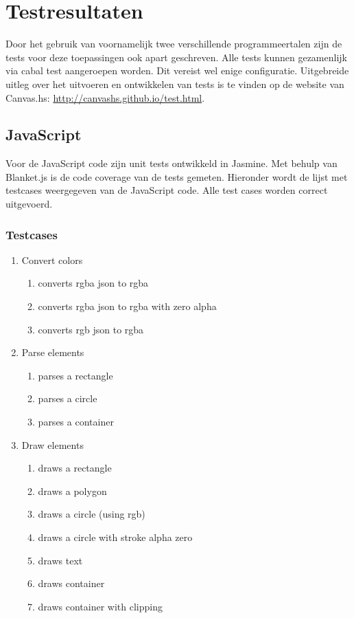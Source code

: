 \section{Testresultaten} \label{sec:testresultaten}


Door het gebruik van voornamelijk twee verschillende programmeertalen zijn de tests voor deze toepassingen ook apart geschreven. Alle tests kunnen gezamenlijk via cabal test aangeroepen worden. Dit vereist wel enige configuratie. Uitgebreide uitleg over het uitvoeren en ontwikkelen van tests is te vinden op de website van Canvas.hs: \url{http://canvashs.github.io/test.html}.

\subsection{JavaScript}
Voor de JavaScript code zijn unit tests ontwikkeld in Jasmine. Met behulp van Blanket.js is de code coverage van de tests gemeten. Hieronder wordt de lijst met testcases weergegeven van de JavaScript code. Alle test cases worden correct uitgevoerd.

\subsubsection{Testcases}
\begin{enumerate}[{T}1]
	\item Convert colors
	\begin{enumerate}
		\item converts rgba json to rgba
		\item converts rgba json to rgba with zero alpha
		\item converts rgb json to rgba
	\end{enumerate}
	\item Parse elements
	\begin{enumerate}
		\item parses a rectangle
		\item parses a circle
		\item parses a container
	\end{enumerate}
	\item Draw elements
	\begin{enumerate}
		\item draws a rectangle
		\item draws a polygon
		\item draws a circle (using rgb)
		\item draws a circle with stroke alpha zero
		\item draws text
		\item draws container
		\item draws container with clipping
	\end{enumerate}
	\setcounter{startvaluetest}{\value{enumi}}
\end{enumerate}

